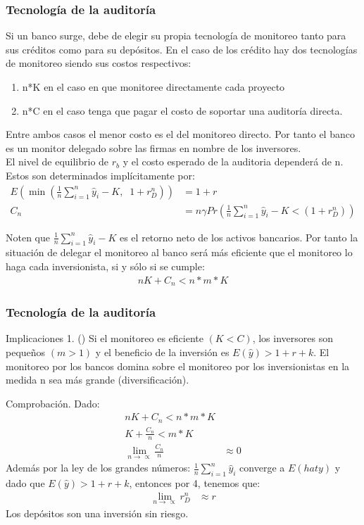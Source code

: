 \documentclass[10pt, xcolor=table, x11names]{beamer}
\begin{document}
\begin{frame}
    \frametitle{{\normalsize Tecnología de la auditoría} {}}
    
    Si un banco surge, debe de elegir su propia tecnología de monitoreo tanto para sus créditos como para su depósitos. En el caso de los crédito hay dos tecnologías de monitoreo siendo sus costos respectivos:
    \begin{enumerate}
        \item n*K en el caso en que monitoree directamente cada proyecto
        \item n*C en el caso tenga que pagar el costo de soportar una auditoría directa.
    \end{enumerate}
    Entre ambos casos el menor costo es el del monitoreo directo. Por tanto el banco es un monitor delegado sobre las firmas en nombre de los inversores. \\
    El nivel de equilibrio de $r_{b} $ y el costo esperado de la auditoria dependerá de n. Estos son determinados implícitamente por:
    \begin{align}
    E(\min(\frac{1}{n}\sum_{i=1}^{n}\hat{y}_{i}-K,\; \; 1+r_{D}^{n}))&=1+r \\
    C_{n}&=n\gamma Pr(\frac{1}{n}\sum_{i=1}^{n}\hat{y}_{i}-K<(1+r_{D}^{n}))
    \end{align}
    
    Noten que $\frac{1}{n}\sum_{i=1}^{n}\hat{y}_{i}-K $ es el retorno neto de los activos bancarios. Por tanto la situación de delegar el monitoreo al banco será más eficiente que el monitoreo lo haga cada inversionista, si y sólo si se cumple:
    \begin{align}
    nK+C_{n}<n*m*K
    \end{align}
    
\end{frame}

\begin{frame}
    \frametitle{{\normalsize Tecnología de la auditoría} {}}
    \begin{block} {Implicaciones 1. (\cite{Diamond1984})}
       Si el monitoreo es eficiente $(K<C)$, los inversores son pequeños $(m>1) $ y el beneficio de la inversión es $ E(\hat{y})>1+r+k$. El monitoreo por los bancos domina sobre el monitoreo por los inversionistas en la medida n sea más grande (diversificación). 
    \end{block}
   Comprobación. Dado:
    \begin{align}
   nK+C_{n}<n*m*K \nonumber\\
   K+\frac{C_{n}}{n}<m*K\nonumber\\
   \lim_{n\rightarrow\propto}\frac{C_{n}}{n}&\approx 0
   \end{align}
    Además por la ley de los grandes números: $\frac{1}{n}\sum_{i=1}^{n}\hat{y}_{i} $ converge a $E(hat{y})$ y dado que $ E(\hat{y})>1+r+k$, entonces por 4, tenemos que:
     \begin{align}
    \lim_{n\rightarrow\propto}r_{D}^{n}&\approx r
    \end{align}
    Los depósitos son una inversión sin riesgo.
   
\end{frame}
\end{document}
